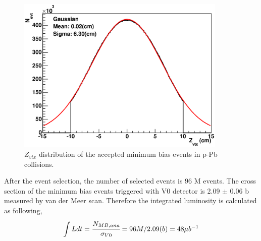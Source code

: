 \begin{figure}[!h]
  \centering
  \includegraphics[width=10cm]{chap4/figure/QA/Zvtx_INT7.eps}
  \caption{$Z_{vtx}$ distribution of the accepted minimum bias events in p-Pb collisions.}
  \label{fig_4_zvtx}
\end{figure}

After the event selection, the number of selected events is 96 M events. 
The cross section of the minimum bias events triggered with V0 detector is 2.09 $\pm$ 0.06 b measured by van der Meer scan\cite{bib_v0cross}. 
Therefore the integrated luminosity is calculated as following, 
\begin{equation}
  \int{Ldt} = \cfrac{N_{MB,ana}}{\sigma_{V0}} = 96 M / 2.09 (b) = 48 \mu b^{-1}
\end{equation}



